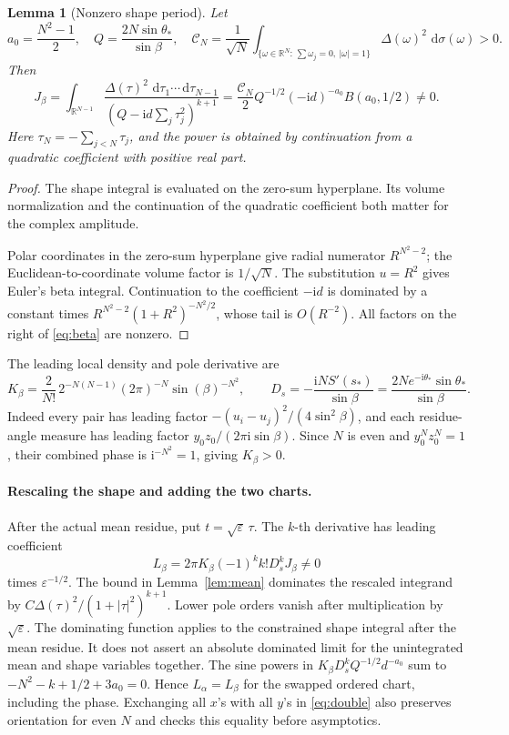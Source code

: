 \documentclass[11pt]{article}
\numberwithin{equation}{section}
\newtheorem{lemma}[theorem]{Lemma}
\theoremstyle{definition}
\newcommand{\dd}{\,\mathrm d}
\newcommand{\ii}{\mathrm i}
\newcommand{\R}{\mathbb R}
\newcommand{\eps}{\varepsilon}
\newcommand{\sstar}{s_*}
\begin{document}
\begin{lemma}[Nonzero shape period]\label{lem:period}
Let
\[
 a_0=\frac{N^2-1}{2},\quad Q=\frac{2N\sin\theta_*}{\sin\beta},\quad
 \mathscr C_N=\frac1{\sqrt N}
 \int_{\{\omega\in\R^N:\,\sum\omega_j=0,\ |\omega|=1\}}
       \Delta(\omega)^2\,\dd\sigma(\omega)>0 .
\]
Then
\begin{equation}
 J_\beta=\int_{\R^{N-1}}\frac{\Delta(\tau)^2\,
                  \dd\tau_1\cdots\dd\tau_{N-1}}
                   {(Q-\ii d\sum_j\tau_j^2)^{k+1}}
 =\frac{\mathscr C_N}{2}Q^{-1/2}(-\ii d)^{-a_0}
                     B(a_0,1/2)\ne0. \label{eq:beta}
\end{equation}
Here \(\tau_N=-\sum_{j<N}\tau_j\), and the power is obtained by
continuation from a quadratic coefficient with positive real part.
\end{lemma}
\begin{proof}
The shape integral is evaluated on the zero-sum hyperplane. Its volume normalization and the continuation of the quadratic coefficient both matter for the complex amplitude.

Polar coordinates in the zero-sum hyperplane give radial numerator
\(R^{N^2-2}\); the Euclidean-to-coordinate volume factor is \(1/\sqrt N\).
The substitution \(u=R^2\) gives Euler's beta integral.
Continuation to the coefficient \(-\ii d\) is dominated by a constant
times \(R^{N^2-2}(1+R^2)^{-N^2/2}\), whose tail is \(O(R^{-2})\).
All factors on the right of \eqref{eq:beta} are nonzero.
\end{proof}

The leading local density and pole derivative are
\[
 K_\beta=\frac2{N!}\,2^{-N(N-1)}(2\pi)^{-N}\sin(\beta)^{-N^2},
 \qquad
 D_s=-\frac{\ii N S'(\sstar)}{\sin\beta}
     =\frac{2N e^{-\ii\theta_*}\sin\theta_*}{\sin\beta}.
\]
Indeed every pair has leading factor
\(- (u_i-u_j)^2/(4\sin^2\beta)\), and each residue-angle measure
has leading factor \(y_0z_0/(2\pi\ii\sin\beta)\).
Since \(N\) is even and \(y_0^Nz_0^N=1\), their combined phase is
\(\ii^{-N^2}=1\), giving \(K_\beta>0\).

\paragraph{Rescaling the shape and adding the two charts.}
After the actual mean residue, put \(t=\sqrt\eps\,\tau\).
The \(k\)-th derivative has leading coefficient
\[
 L_\beta=2\pi K_\beta(-1)^k k!D_s^kJ_\beta\ne0
\]
times \(\eps^{-1/2}\). The bound in Lemma~\ref{lem:mean} dominates
the rescaled integrand by
\(C\Delta(\tau)^2/(1+|\tau|^2)^{k+1}\).
Lower pole orders vanish after multiplication by \(\sqrt\eps\).
The dominating function applies to the constrained shape integral
after the mean residue. It does not assert an absolute dominated limit
for the unintegrated mean and shape variables together.
The sine powers in \(K_\beta D_s^kQ^{-1/2}d^{-a_0}\) sum to
\(-N^2-k+1/2+3a_0=0\). Hence \(L_\alpha=L_\beta\)
for the swapped ordered chart, including the phase. Exchanging all
\(x\)'s with all \(y\)'s in \eqref{eq:double} also preserves orientation
for even \(N\) and checks this equality before asymptotics.
\end{document}
